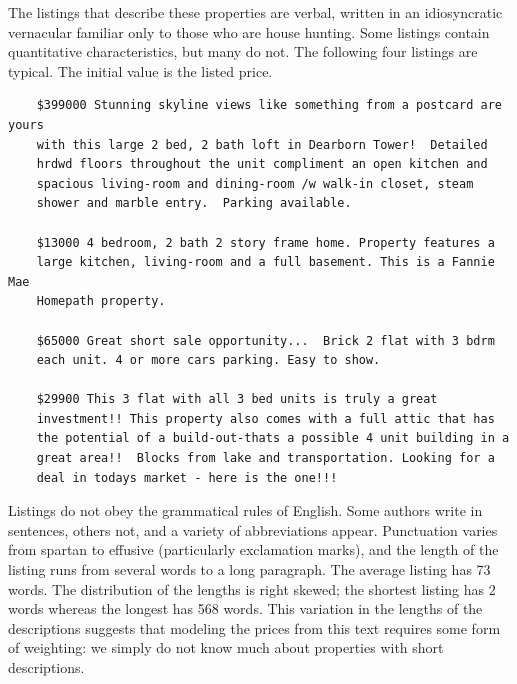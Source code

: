 \documentclass[12pt]{article}
\begin{document}
 The listings that describe these properties are verbal, written in an
 idiosyncratic vernacular familiar only to those who are house hunting.  Some
 listings contain quantitative characteristics, but many do not.  The 
 following four listings are typical.  The initial value is the listed price.

 \begin{verbatim}
    $399000 Stunning skyline views like something from a postcard are yours
    with this large 2 bed, 2 bath loft in Dearborn Tower!  Detailed
    hrdwd floors throughout the unit compliment an open kitchen and
    spacious living-room and dining-room /w walk-in closet, steam
    shower and marble entry.  Parking available. 

    $13000 4 bedroom, 2 bath 2 story frame home. Property features a
    large kitchen, living-room and a full basement. This is a Fannie Mae
    Homepath property. 

    $65000 Great short sale opportunity...  Brick 2 flat with 3 bdrm
    each unit. 4 or more cars parking. Easy to show. 

    $29900 This 3 flat with all 3 bed units is truly a great
    investment!! This property also comes with a full attic that has
    the potential of a build-out-thats a possible 4 unit building in a 
    great area!!  Blocks from lake and transportation. Looking for a
    deal in todays market - here is the one!!! 
 \end{verbatim}

 \noindent
 Listings do not obey the grammatical rules of English.  Some authors write in
 sentences, others not, and a variety of abbreviations appear.  Punctuation
 varies from spartan to effusive (particularly exclamation marks), and the
 length of the listing runs from several words to a long paragraph.  The average
 listing has 73 words. The distribution of the lengths is right skewed; the
 shortest listing has 2 words whereas the longest has 568 words.  This variation
 in the lengths of the descriptions suggests that modeling the prices from this
 text requires some form of weighting: we simply do not know much about
 properties with short descriptions.
\end{document}
